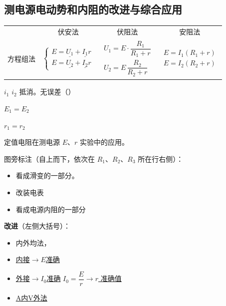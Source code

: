 \subsection{测电源电动势和内阻的改进与综合应用}
\begin{center}
\renewcommand{\arraystretch}{1.6}
\begin{tabular}{@{}c c c c@{}}
 & 伏安法 & 伏阻法 & 安阻法\\
方程组法 &
$\left\{\begin{array}{l} E=\underline{U_1}+\underline{I_1}r\\ E=\underline{U_2}+\underline{I_2}r\end{array}\right.$ &
$\begin{array}{l} U_1=E\cdot\dfrac{R_1}{R_1+r}\\[6pt] U_2=E\,\dfrac{R_2}{R_2+r}\end{array}$ &
$\begin{array}{l} E=I_1(R_1+r)\\ E=I_2(R_2+r)\end{array}$
\end{tabular}
\end{center}


$i_1$ $i_2$ 抵消。无误差（）

$E_1=E_2$

$r_1=r_2$

定值电阻在测电源 $E$、$r$ 实验中的应用。


图旁标注（自上而下，依次在 $R_1$、$R_2$、$R_3$ 所在行右侧）：
\begin{itemize}
\item 看成滑变的一部分。
\item 改装电表
\item 看成电源内阻的一部分
\end{itemize}

\textbf{改进}（左侧大括号）：
\begin{itemize}
\item 内外均法，
\item \underline{内接$\to E$准确} %
\item \underline{外接$\to I_0$准确} \quad \underline{$I_0=\dfrac{E}{r}\to r$ 准确值} %
\item \underline{A内V外法} %
\end{itemize}

